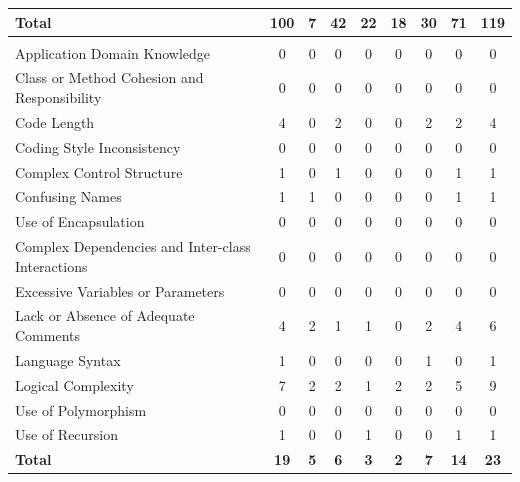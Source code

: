\begin{table}[t]
\begin{tabularx}{\textwidth}{>{\raggedright\arraybackslash}X *{8}{c}}
\midrule
\textbf{Total} & \textbf{100} & \textbf{7} & \textbf{42} & \textbf{22} & \textbf{18} & \textbf{30} & \textbf{71} & \textbf{119} \\
\midrule
\multicolumn{9}{l}{\textit{Self-admitted difficulty: No}} \\
\midrule
Application Domain Knowledge                      & 0  & 0  & 0  & 0  & 0  & 0  & 0  & 0 \\
Class or Method Cohesion and Responsibility       & 0  & 0  & 0  & 0  & 0  & 0  & 0  & 0 \\
Code Length                                       & 4  & 0  & 2  & 0  & 0  & 2  & 2  & 4 \\
Coding Style Inconsistency                        & 0  & 0  & 0  & 0  & 0  & 0  & 0  & 0 \\
Complex Control Structure                         & 1  & 0  & 1  & 0  & 0  & 0  & 1  & 1 \\
Confusing Names                                   & 1  & 1  & 0  & 0  & 0  & 0  & 1  & 1 \\
Use of Encapsulation                              & 0  & 0  & 0  & 0  & 0  & 0  & 0  & 0 \\
Complex Dependencies and Inter-class Interactions & 0  & 0  & 0  & 0  & 0  & 0  & 0  & 0 \\
Excessive Variables or Parameters                 & 0  & 0  & 0  & 0  & 0  & 0  & 0  & 0 \\
Lack or Absence of Adequate Comments              & 4  & 2  & 1  & 1  & 0  & 2  & 4  & 6 \\
Language Syntax                                   & 1  & 0  & 0  & 0  & 0  & 1  & 0  & 1 \\
Logical Complexity                                & 7  & 2  & 2  & 1  & 2  & 2  & 5  & 9 \\
Use of Polymorphism                               & 0  & 0  & 0  & 0  & 0  & 0  & 0  & 0 \\
Use of Recursion                                  & 1  & 0  & 0  & 1  & 0  & 0  & 1  & 1 \\
\midrule
\textbf{Total} & \textbf{19} & \textbf{5} & \textbf{6} & \textbf{3} & \textbf{2} & \textbf{7} & \textbf{14} & \textbf{23} \\
\bottomrule
\end{tabularx}
\end{table}
